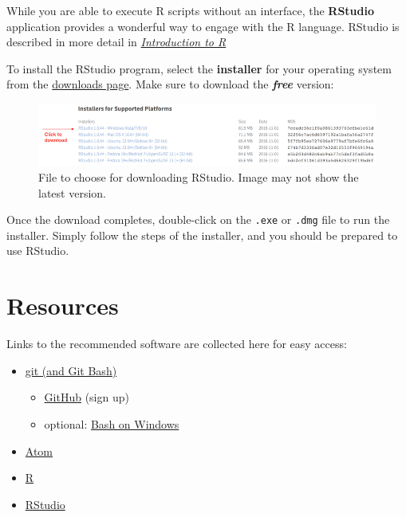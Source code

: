 \documentclass[]{book}
\providecommand{\tightlist}{%
  \setlength{\itemsep}{0pt}\setlength{\parskip}{0pt}}
\theoremstyle{definition}
\theoremstyle{definition}
\theoremstyle{remark}
\begin{document}
While you are able to execute R scripts without an interface, the
\textbf{RStudio} application provides a wonderful way to engage with the
R language. RStudio is described in more detail in
\emph{\protect\hyperlink{r-intro}{Introduction to R}}

To install the RStudio program, select the \textbf{installer} for your
operating system from the
\href{https://www.rstudio.com/products/rstudio/download/}{downloads
page}. Make sure to download the \textbf{\emph{free}} version:

\begin{figure}
\centering
\includegraphics{img/setup/rstudio-download.png}
\caption{File to choose for downloading RStudio. Image may not show the
latest version.}
\end{figure}

Once the download completes, double-click on the \texttt{.exe} or
\texttt{.dmg} file to run the installer. Simply follow the steps of the
installer, and you should be prepared to use RStudio.

\hypertarget{resources}{\section*{Resources}\label{resources}}


Links to the recommended software are collected here for easy access:

\begin{itemize}
\tightlist
\item
  \href{https://git-scm.com/downloads}{git (and Git Bash)}

  \begin{itemize}
  \tightlist
  \item
    \href{https://github.com/join}{GitHub} (sign up)
  \item
    optional:
    \href{https://msdn.microsoft.com/en-us/commandline/wsl/install_guide}{Bash
    on Windows}
  \end{itemize}
\item
  \href{https://atom.io/}{Atom}
\item
  \href{https://cran.rstudio.com/}{R}
\item
  \href{https://www.rstudio.com/products/rstudio/download3/}{RStudio}
\end{itemize}
\end{document}
